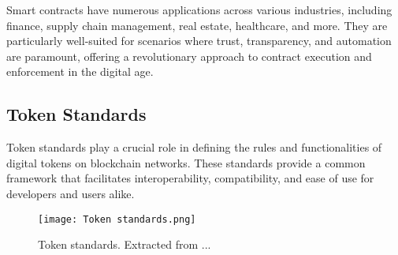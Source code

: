 Smart contracts have numerous applications across various industries, including finance, supply chain management, real estate, healthcare, and more. They are particularly well-suited for scenarios where trust, transparency, and automation are paramount, offering a revolutionary approach to contract execution and enforcement in the digital age.

\subsection{Token Standards}
\label{subsec:token_standards}

Token standards play a crucial role in defining the rules and functionalities of digital tokens on blockchain networks. These standards provide a common framework that facilitates interoperability, compatibility, and ease of use for developers and users alike.

\begin{figure}[H]
    \texttt{[image: Token standards.png]}
    \caption[Token standards]{Token standards. Extracted from ...}
    \label{fig:token_standards}
\end{figure}

